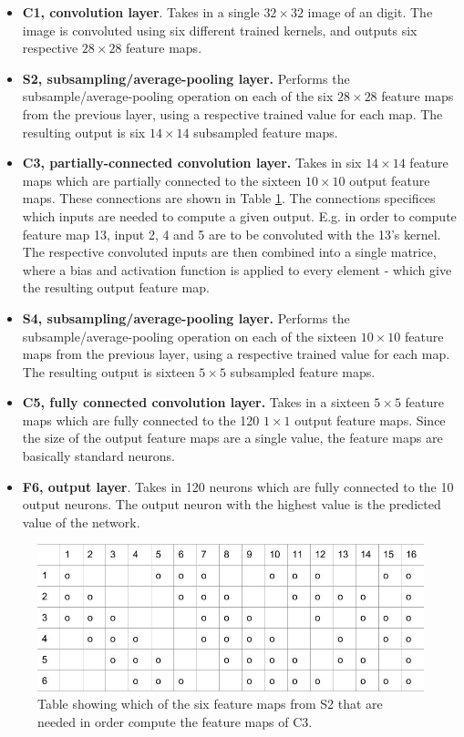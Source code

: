 \begin{itemize}
  \item \textbf{C1, convolution layer}. Takes in a single $ 32 \times 32 $ image of an digit. The image is convoluted using six different trained kernels, and outputs six respective $ 28 \times 28 $ feature maps. 
  \item \textbf{S2, subsampling/average-pooling layer.} Performs the subsample/average-pooling operation on each of the six $ 28 \times 28 $ feature maps from the previous layer, using a respective trained value for each map. The resulting output is six $ 14 \times 14 $ subsampled feature maps. 
  \item \textbf{C3, partially-connected convolution layer.} Takes in six $ 14 \times 14 $ feature maps which are partially connected to the sixteen $ 10 \times 10 $ output feature maps. These connections are shown in Table \ref{table_partial_connections}. The connections specifices which inputs are needed to compute a given output. E.g. in order to compute feature map 13, input 2, 4 and 5 are to be convoluted with the 13's kernel. The respective convoluted inputs are then combined into a single matrice, where a bias and activation function is applied to every element - which give the resulting output feature map. 
  \item \textbf{S4, subsampling/average-pooling layer.} Performs the subsample/average-pooling operation on each of the sixteen $ 10 \times 10 $ feature maps from the previous layer, using a respective trained value for each map. The resulting output is sixteen $ 5 \times 5 $ subsampled feature maps.
  \item \textbf{C5, fully connected convolution layer.} Takes in a sixteen $ 5 \times 5 $ feature maps which are fully connected to the 120 $ 1 \times 1 $ output feature maps. Since the size of the output feature maps are a single value, the feature maps are basically standard neurons. 
  \item \textbf{F6, output layer}. Takes in 120 neurons which are fully connected to the 10 output neurons. The output neuron with the highest value is the predicted value of the network. 
\end{itemize}


\begin{figure}[h!]
  \centering
      \includegraphics[width=1.0\textwidth]{Figures/Method/partial_connections}
    \caption{Table showing which of the six feature maps from S2 that are needed in order compute the feature maps of C3.}
    \label{table_partial_connections}
\end{figure}


